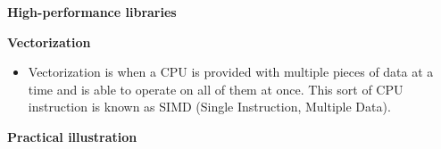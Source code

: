 \begin{frame}\begin{center}
		\LARGE\textbf{High-performance libraries}
\end{center}\end{frame}
\begin{frame}\textbf{Vectorization}\vspace{0.3cm}

\begin{itemize}\setlength\itemsep{1em}
    \item Vectorization is when a CPU is provided with multiple pieces of data at a time and is able to operate on all of them at once. This sort of CPU instruction is known as SIMD (Single Instruction, Multiple Data).
\end{itemize}

\end{frame}
\begin{frame}\textbf{Practical illustration}\vspace{0.3cm}
  	\begin{figure}[htp]\centering
  	\end{figure}
\end{frame}
